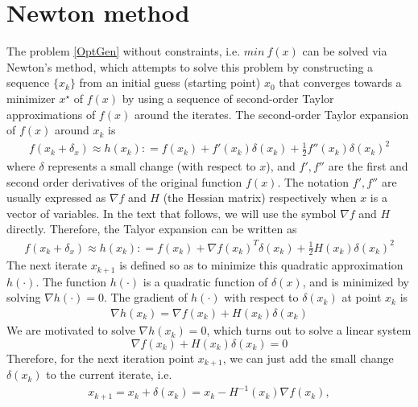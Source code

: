 \documentclass  [
  paper    = a4,
  BCOR     = 10mm,
  twoside,
  fontsize = 12pt,
  fleqn,
  toc      = bibnumbered,
  toc      = listofnumbered,
  numbers  = noendperiod,
  headings = normal,
  listof   = leveldown,
  version  = 3.03
]                                       {scrreprt}
\newcommand{\<}{\langle}
\renewcommand{\>}{\rangle}
\begin{document}
   \section{Newton method}
   The problem \ref{OptGen} without constraints, i.e. $min \  f(x)$  can be solved via Newton's method, which attempts to solve this problem by constructing a sequence $\{x_k\}$ from an initial guess (starting point) $x_0$ that converges towards a minimizer $x^\star$ of $f(x)$  by using a sequence of second-order Taylor approximations of $f(x)$ around the iterates. The second-order Taylor expansion of $f(x)$ around $x_k$ is
   \begin{align*}
   f(x_k + \delta_x) \approx h(x_k) : = f(x_k) + f'(x_k)\delta(x_k) +\frac{1}{2}f''(x_k)\delta(x_k)^2 
   \end{align*}
   where $\delta$ represents a small change (with respect to $x$), and $f', f''$ are the first and second order derivatives of the original function $f(x)$. The notation $f', f''$ are usually expressed as $\nabla f$ and  $H$ (the Hessian matrix) respectively when $x$ is a vector of variables. In the text that follows, we will use the symbol $\nabla f$ and $H$ directly. Therefore, the Talyor expansion can be written as 
   \begin{align*}
   f(x_k + \delta_x) \approx h(x_k) : = f(x_k) + \nabla f(x_k)^T\delta(x_k) +\frac{1}{2}H(x_k)\delta(x_k)^2 
   \end{align*}
   The next iterate $x_{k+1}$ is defined so as to minimize this quadratic approximation $h(\cdot)$. The function $h(\cdot)$ is a quadratic function of $\delta(x)$, and is minimized by solving $\nabla h(\cdot) = 0$. The gradient of $h(\cdot)$ with respect to $\delta(x_k)$ at point $x_k$ is
   \begin{align*}
   \nabla h(x_k) = \nabla f(x_k) + H(x_k) \delta(x_k) 
   \end{align*}
   We are motivated to solve $\nabla h(x_k) =0$, which turns out to solve a linear system
   \begin{equation}
   \nabla f(x_k) + H(x_k) \delta(x_k) =0
   \label{HessianEq}
   \end{equation}
   Therefore, for the next iteration point $x_{k+1}$, we can just add the small change $\delta(x_k)$ to the current iterate, i.e. 
   \begin{align*}
   x_{k+1}  = x_k + \delta(x_k) = x_k - H^{-1}(x_k)\nabla f(x_k), 
   \end{align*}
\end{document}
